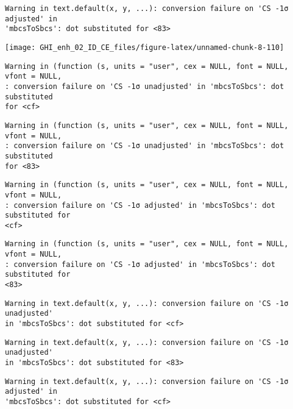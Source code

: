 \documentclass[
  10pt,
  a4paper,oneside]{article}
\begin{document}
\begin{verbatim}
Warning in text.default(x, y, ...): conversion failure on 'CS -1σ adjusted' in
'mbcsToSbcs': dot substituted for <83>
\end{verbatim}

\begin{center}\texttt{[image: GHI\_enh\_02\_ID\_CE\_files/figure-latex/unnamed-chunk-8-110]} \end{center}

\begin{verbatim}
Warning in (function (s, units = "user", cex = NULL, font = NULL, vfont = NULL,
: conversion failure on 'CS -1σ unadjusted' in 'mbcsToSbcs': dot substituted
for <cf>
\end{verbatim}

\begin{verbatim}
Warning in (function (s, units = "user", cex = NULL, font = NULL, vfont = NULL,
: conversion failure on 'CS -1σ unadjusted' in 'mbcsToSbcs': dot substituted
for <83>
\end{verbatim}

\begin{verbatim}
Warning in (function (s, units = "user", cex = NULL, font = NULL, vfont = NULL,
: conversion failure on 'CS -1σ adjusted' in 'mbcsToSbcs': dot substituted for
<cf>
\end{verbatim}

\begin{verbatim}
Warning in (function (s, units = "user", cex = NULL, font = NULL, vfont = NULL,
: conversion failure on 'CS -1σ adjusted' in 'mbcsToSbcs': dot substituted for
<83>
\end{verbatim}

\begin{verbatim}
Warning in text.default(x, y, ...): conversion failure on 'CS -1σ unadjusted'
in 'mbcsToSbcs': dot substituted for <cf>
\end{verbatim}

\begin{verbatim}
Warning in text.default(x, y, ...): conversion failure on 'CS -1σ unadjusted'
in 'mbcsToSbcs': dot substituted for <83>
\end{verbatim}

\begin{verbatim}
Warning in text.default(x, y, ...): conversion failure on 'CS -1σ adjusted' in
'mbcsToSbcs': dot substituted for <cf>
\end{verbatim}
\end{document}
